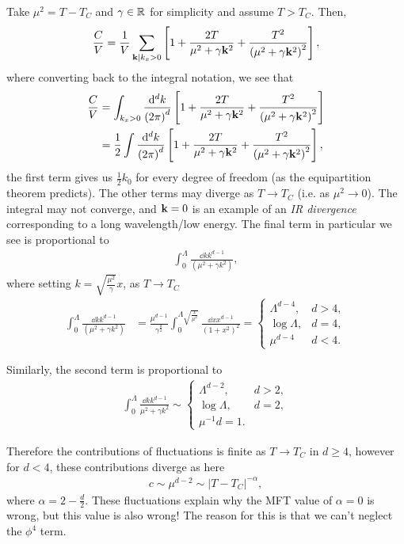 Take $\mu^2 = T - T_C$ and $\gamma \in \mathbb{R}$ for simplicity and assume $T > T_C$. Then,
\begin{align}
    \frac{C}{V} = \frac{1}{V} \sum_{\vb{k} | k_x > 0}^{}  \left[ 1 + \frac{2T}{\mu^2 + \gamma \vb{k}^2} + \frac{T^2}{\left( \mu^2 + \gamma \vb{k}^2 \right)^2} \right] 
,\end{align}
where converting back to the integral notation, we see that
\begin{align}
    \frac{C}{V} &= \int_{k_x > 0} \frac{\dd{^{d}k}}{\left( 2\pi \right)^{d}}\left[ 1 + \frac{2T}{\mu^2 + \gamma \vb{k}^2} + \frac{T^2}{\left( \mu^2 + \gamma \vb{k}^2 \right)^2} \right] \\
    &= \frac{1}{2} \int \frac{\dd{^{d}k}}{\left( 2\pi \right)^{d}}\left[ 1 + \frac{2T}{\mu^2 + \gamma \vb{k}^2} + \frac{T^2}{\left( \mu^2 + \gamma \vb{k}^2 \right)^2} \right]
,\end{align}
the first term gives us $\frac{1}{2}k_0$ for every degree of freedom (as the equipartition theorem predicts). The other terms may diverge as $T \to T_C$ (i.e. as $\mu^2 \to 0$). The integral may not converge, and $\vb{k} = 0$ is an example of an \textit{IR divergence} corresponding to a long wavelength/low energy. The final term in particular we see is proportional to
\begin{align}
    \int_0^{\Lambda} \frac{\dd{k} k^{d-1}}{\left( \mu^2 + \gamma k^2 \right) } 
,\end{align}
where setting $k = \sqrt{\frac{\mu^2}{\gamma}} x$, as $T \to T_C$
\begin{align}
    \int_0^{\Lambda} \frac{\dd{k} k^{d-1}}{\left( \mu^2 + \gamma k^2 \right) }  &=  \frac{\mu^{d-1}}{\gamma^{\frac{d}{2}}} \int_0^{\Lambda \sqrt{\frac{x}{\mu^2}} } \frac{\dd{x} x^{d-1}}{\left( 1 + x^2 \right)^2} = \begin{cases}
        \Lambda^{d-4}, & d > 4, \\
        \log \Lambda, & d = 4,\\
        \mu^{d-4} & d < 4.
    \end{cases}
\end{align}

Similarly, the second term is proportional to
\begin{align}
    \int_0^{\Lambda} \frac{\dd{k}k^{d-1}}{\mu^2 + \gamma k^2} \sim  \begin{cases}
        \Lambda^{d-2}, & d > 2,\\
        \log \Lambda, & d = 2,\\
        \mu^{-1} d = 1.
    \end{cases}
\end{align}

Therefore the contributions of fluctuations is finite as $T \to T_C$ in $d \geq 4$, however for $d < 4$, these contributions diverge as here
\begin{align}
    c \sim \mu^{d-2} \sim  \left| T - T_C \right|^{-\alpha}
,\end{align}
where $\alpha = 2-\frac{d}{2}$. These fluctuations explain why the MFT value of $\alpha = 0$ is wrong, but this value is also wrong! The reason for this is that we can't neglect the $\phi^{4}$ term.
